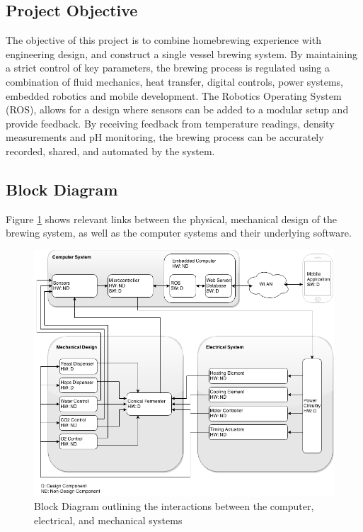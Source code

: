 \documentclass{article}
\begin{document}
\subsection{Project Objective}
The objective of this project is to combine homebrewing experience with engineering design, and construct a single vessel brewing system. By maintaining a strict control of key parameters, the brewing process is regulated using a combination of fluid mechanics, heat transfer, digital controls, power systems, embedded robotics and mobile development. The Robotics Operating System (ROS), allows for a design where sensors can be added to a modular setup and provide feedback. By receiving feedback from temperature readings, density measurements and pH monitoring, the brewing process can be accurately recorded, shared, and automated by the system. 
\subsection{Block Diagram}
Figure \ref{fig:block} shows relevant links between the physical, mechanical design of the brewing system, as well as the computer systems and their underlying software.

\begin{figure}[H]
\begin{center}
\includegraphics[scale=0.58]{block-diagram.png}
\caption{Block Diagram outlining the interactions between the computer, electrical, and mechanical systems}
\label{fig:block}
\end{center}
\end{figure}
\end{document}
